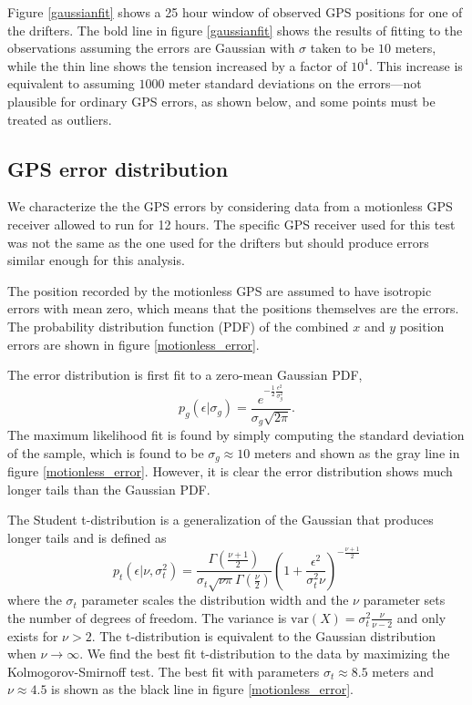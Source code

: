 \documentclass[10pt,journal]{IEEEtran}
\begin{document}
Figure \ref{gaussianfit} shows a 25 hour window of observed GPS positions for one of the drifters. The bold line in figure \ref{gaussianfit} shows the results of fitting to the observations assuming the errors are Gaussian with $\sigma$ taken to be $10$ meters, while the thin line shows the tension increased by a factor of $10^4$. This increase is equivalent to assuming $1000$ meter standard deviations on the errors---not plausible for ordinary GPS errors, as shown below, and some points must be treated as outliers. 

%
\subsection{GPS error distribution}
%

We characterize the the GPS errors by considering data from a motionless GPS receiver allowed to run for 12 hours. The specific GPS receiver used for this test was not the same as the one used for the drifters but should produce errors similar enough for this analysis.

The position recorded by the motionless GPS are assumed to have isotropic errors with mean zero, which means that the positions themselves are the errors. The probability distribution function (PDF) of the combined $x$ and $y$ position errors are shown in figure \ref{motionless_error}.

The error distribution is first fit to a zero-mean Gaussian PDF,
\begin{equation}
p_g(\epsilon|\sigma_g) = \frac{e^{-\frac{1}{2}\frac{\epsilon^2}{\sigma_g^2}} }{\sigma_g \sqrt{ 2 \pi}}.
\end{equation}
The maximum likelihood fit is found by simply computing the standard deviation of the sample, which is found to be $\sigma_g \approx 10$ meters and shown as the gray line in figure \ref{motionless_error}. However, it is clear the error distribution shows much longer tails than the Gaussian PDF.

The Student t-distribution is a generalization of the Gaussian that produces longer tails and is defined as 
\begin{equation}
\label{student_pdf}
p_t\left(\epsilon |\nu,\sigma_t^2\right) = \frac{\Gamma\left( \frac{\nu + 1}{2} \right)}{\sigma_t \sqrt{\nu \pi} \Gamma\left(\frac{\nu}{2}\right)} \left( 1 + \frac{\epsilon^2}{\sigma_t^2 \nu} \right)^{-\frac{\nu+1}{2}}
\end{equation}
where the $\sigma_t$ parameter scales the distribution width and the $\nu$ parameter sets the number of degrees of freedom. The variance is $\textrm{var}(X)=\sigma_t^2 \frac{\nu}{\nu-2}$ and only exists for $\nu > 2$. The t-distribution is equivalent to the Gaussian distribution when $\nu \rightarrow \infty$. We find the best fit t-distribution to the data by maximizing the Kolmogorov-Smirnoff test. The best fit with parameters $\sigma_t \approx 8.5$ meters and $\nu \approx 4.5$ is shown as the black line in figure \ref{motionless_error}.
\end{document}
